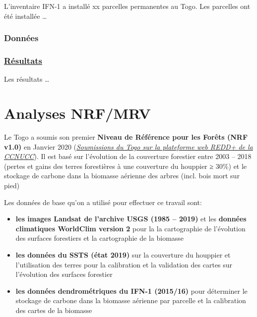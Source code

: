 \documentclass[a4paper, notitlepage, 12pt, krantz2]{krantz}
\providecommand{\tightlist}{%
  \setlength{\itemsep}{0pt}\setlength{\parskip}{0pt}}
\begin{document}
L'inventaire IFN-1 a installé xx parcelles permanentes au Togo. Les parcelles ont été installée \ldots{}

\hypertarget{donnees}{%
\subsubsection{Données}\label{donnees}}

\hypertarget{resultats}{%
\subsubsection{\texorpdfstring{\href{../02_IFN/01_IFN-1/03_docs/IFN-1_Togo_MERF_Rapport_Finale.pdf}{Résultats}}{Résultats}}\label{resultats}}

Les résultats \ldots{}

\hypertarget{NRF-MRV}{%
\section{Analyses NRF/MRV}\label{NRF-MRV}}

Le Togo a soumis son premier \textbf{Niveau de Référence pour les Forêts (NRF v1.0)} en Janvier 2020 (\href{https://redd.unfccc.int/submissions.html?country=tgo}{\emph{Soumissions du Togo sur la plateforme web REDD+ de la CCNUCC}}). Il est basé sur l'évolution de la couverture forestier entre 2003 -- 2018 (pertes et gains des terres forestières à une couverture du houppier ≥ 30\%) et le stockage de carbone dans la biomasse aérienne des arbres (incl. bois mort sur pied)

Les données de base qu'on a utilisé pour effectuer ce travail sont:

\begin{itemize}
\tightlist
\item
  \textbf{les images Landsat de l'archive USGS (1985 -- 2019)} et les \textbf{données climatiques WorldClim version 2} pour la la cartographie de l'évolution des surfaces forestiers et la cartographie de la biomasse
\item
  \textbf{les données du SSTS (état 2019)} sur la couverture du houppier et l'utilisation des terres pour la calibration et la validation des cartes sur l'évolution des surfaces forestier
\item
  \textbf{les données dendrométriques du IFN-1 (2015/16)} pour déterminer le stockage de carbone dans la biomasse aérienne par parcelle et la calibration des cartes de la biomasse
\end{itemize}
\end{document}
